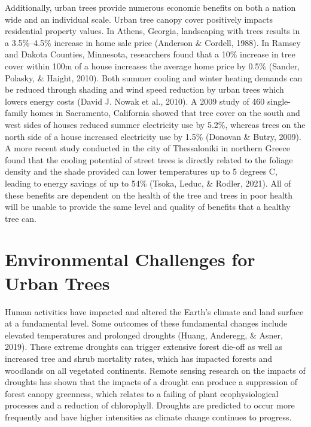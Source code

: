 \documentclass[12pt,twoside]{reedthesis}
\begin{document}
Additionally, urban trees provide numerous economic benefits on both a
nation wide and an individual scale. Urban tree canopy cover positively
impacts residential property values. In Athens, Georgia, landscaping
with trees results in a 3.5\%--4.5\% increase in home sale price
(Anderson \& Cordell, 1988). In Ramsey and Dakota Counties, Minnesota, researchers
found that a 10\% increase in tree cover within 100m of a house increases
the average home price by 0.5\% (Sander, Polasky, \& Haight, 2010). Both summer cooling and
winter heating demands can be reduced through shading and wind speed
reduction by urban trees which lowers energy costs (David J. Nowak et al., 2010). A 2009
study of 460 single-family homes in Sacramento, California showed that
tree cover on the south and west sides of houses reduced summer
electricity use by 5.2\%, whereas trees on the north side of a house
increased electricity use by 1.5\% (Donovan \& Butry, 2009). A more recent study
conducted in the city of Thessaloniki in northern Greece found that the
cooling potential of street trees is directly related to the foliage
density and the shade provided can lower temperatures up to 5 degrees C,
leading to energy savings of up to 54\% (Tsoka, Leduc, \& Rodler, 2021). All of these
benefits are dependent on the health of the tree and trees in poor
health will be unable to provide the same level and quality of benefits
that a healthy tree can.

\hypertarget{environmental-challenges-for-urban-trees}{%
\section{Environmental Challenges for Urban Trees}\label{environmental-challenges-for-urban-trees}}

Human activities have impacted and altered the Earth's climate and land
surface at a fundamental level. Some outcomes of these fundamental
changes include elevated temperatures and prolonged droughts
(Huang, Anderegg, \& Asner, 2019). These extreme droughts can trigger extensive forest
die-off as well as increased tree and shrub mortality rates, which has
impacted forests and woodlands on all vegetated continents. Remote
sensing research on the impacts of droughts has shown that the impacts
of a drought can produce a suppression of forest canopy greenness, which
relates to a failing of plant ecophysiological processes and a reduction
of chlorophyll. Droughts are predicted to occur more frequently and have
higher intensities as climate change continues to progress.
\end{document}
